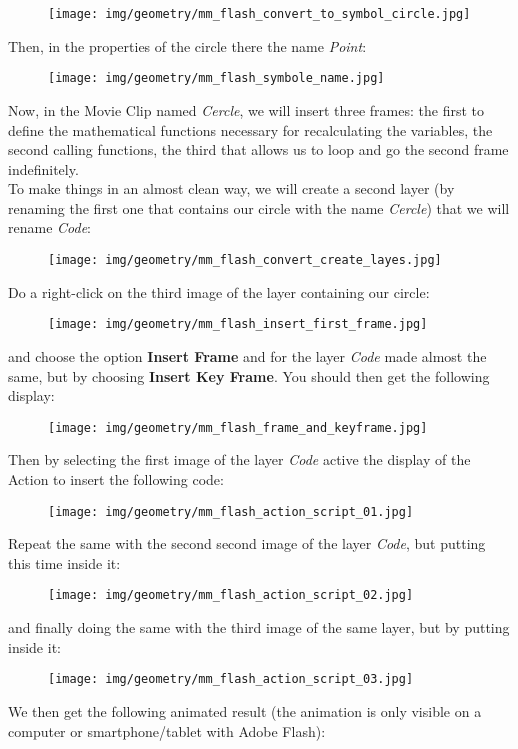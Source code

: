 	\begin{tcolorbox}[colframe=black,colback=white,sharp corners]
	\begin{figure}[H]
		\centering
		\texttt{[image: img/geometry/mm\_flash\_convert\_to\_symbol\_circle.jpg]}
	\end{figure}
	Then, in the properties of the circle there the name \textit{Point}:
	\begin{figure}[H]
		\centering
		\texttt{[image: img/geometry/mm\_flash\_symbole\_name.jpg]}
	\end{figure}
	Now, in the Movie Clip named \textit{Cercle}, we will insert three frames: the first to define the mathematical functions necessary for recalculating the variables, the second calling functions, the third that allows us to loop and go the second frame indefinitely.\\
	
	To make things in an almost clean way, we will create a second layer (by renaming the first one that contains our circle with the name \textit{Cercle}) that we will rename \textit{Code}:
	\begin{figure}[H]
		\centering
		\texttt{[image: img/geometry/mm\_flash\_convert\_create\_layes.jpg]}
	\end{figure}
	Do a right-click on the third image of the layer containing our circle:
	\begin{figure}[H]
		\centering
		\texttt{[image: img/geometry/mm\_flash\_insert\_first\_frame.jpg]}
	\end{figure}
	and choose the option \textbf{Insert Frame} and for the layer \textit{Code} made almost the same, but by choosing \textbf{Insert Key Frame}. You should then get the following display:
	\end{tcolorbox}
	
	\begin{tcolorbox}[colframe=black,colback=white,sharp corners]
	\begin{figure}[H]
		\centering
		\texttt{[image: img/geometry/mm\_flash\_frame\_and\_keyframe.jpg]}
	\end{figure}
	Then by selecting the first image of the layer \textit{Code} active the display of the Action to insert the following code:
	\begin{figure}[H]
		\centering
		\texttt{[image: img/geometry/mm\_flash\_action\_script\_01.jpg]}
	\end{figure}	
	Repeat the same with the second second image of the layer \textit{Code}, but putting this time inside it:
	\begin{figure}[H]
		\texttt{[image: img/geometry/mm\_flash\_action\_script\_02.jpg]}
	\end{figure}
	and finally doing the same with the third image of the same layer, but by putting inside it:
	\begin{figure}[H]
		\texttt{[image: img/geometry/mm\_flash\_action\_script\_03.jpg]}
	\end{figure}
	We then get the following animated result (the animation is only visible on a computer or smartphone/tablet with Adobe Flash):	
	\end{tcolorbox}
	
